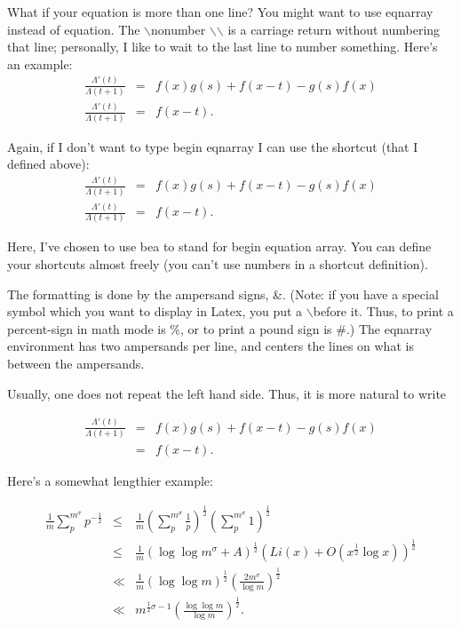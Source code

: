 \documentclass[12pt,reqno]{amsart}
\newcommand\bea{\begin{eqnarray}}
\newcommand\eea{\end{eqnarray}}
\newcommand{\foh}{\frac{1}{2}}  %
\numberwithin{equation}{section}
\begin{document}
What if your equation is more than one line? You might want to use
eqnarray instead of equation. The $\backslash$nonumber
$\backslash$$\backslash$ is a carriage return without numbering
that line; personally, I like to wait to the last line to number
something. Here's an example:
\begin{eqnarray}
\frac{\Lambda'(t)}{\Lambda(t+1)} & = & f(x) g(s) + f(x-t) -
g(s)f(x) \nonumber\\ \frac{\Lambda'(t)}{\Lambda(t+1)} & = & f(x -
t).
\end{eqnarray}

Again, if I don't want to type begin eqnarray I can use the
shortcut (that I defined above): \bea
\frac{\Lambda'(t)}{\Lambda(t+1)} & = & f(x)
g(s) + f(x-t) - g(s)f(x) \nonumber\\
\frac{\Lambda'(t)}{\Lambda(t+1)} & = & f(x - t). \eea

Here, I've chosen to use bea to stand for begin equation array.
You can define your shortcuts almost freely (you can't use numbers
in a shortcut definition).

The formatting is done by the ampersand signs, \&. (Note: if you
have a special symbol which you want to display in Latex, you put
a $\backslash$before it. Thus, to print a percent-sign in math
mode is \%, or to print a pound sign is \#.) The eqnarray
environment has two ampersands per line, and centers the lines on
what is between the ampersands.

Usually, one does not repeat the left hand side. Thus, it is more
natural to write

\begin{eqnarray}
\frac{\Lambda'(t)}{\Lambda(t+1)} & = & f(x) g(s) + f(x-t) -
g(s)f(x) \nonumber\\  & = & f(x - t).
\end{eqnarray}

Here's a somewhat lengthier example:

\begin{eqnarray}
\frac{1}{m}\sum_p^{m^\sigma} p^{-\foh} & \le & \frac{1}{m} (
\sum_p^{m^\sigma} \frac{1}{p})^{\foh} ( \sum_p^{m^\sigma}
1)^{\foh} \nonumber\\ & \le & \frac{1}{m} (\log \log m^{\sigma} +
A)^{\foh} (Li(x) + O(x^{\foh} \log x))^{\foh} \nonumber\\ & \ll &
\frac{1}{m} (\log \log m)^{\foh} (\frac{2m^{\sigma}}{\log
m})^{\foh} \nonumber\\ & \ll & m^{\foh \sigma - 1} (\frac{\log
\log m}{\log m})^{\foh}.
\end{eqnarray}
\end{document}
